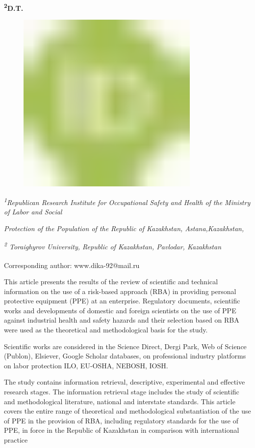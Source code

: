 {\bfseries \textsuperscript{2}D.T.
\begin{figure}[H]
	\centering
	\includegraphics[width=0.8\textwidth]{media/chem2/image1}
	\caption*{}
\end{figure}


\emph{\textsuperscript{1}Republican Research Institute for Occupational
Safety and Health of the Ministry of Labor and Social}

\emph{Protection of the Population of the Republic of Kazakhstan,
Astana,Kazakhstan,}

\emph{\textsuperscript{2} Toraighyrov University, Republic of
Kazakhstan, Pavlodar, Kazakhstan}

{\bfseries \textsuperscript{\envelope }}Corresponding author: www.dika-92@mail.ru

This article presents the results of the review of scientific and
technical information on the use of a risk-based approach (RBA) in
providing personal protective equipment (PPE) at an enterprise.
Regulatory documents, scientific works and developments of domestic and
foreign scientists on the use of PPE against industrial health and
safety hazards and their selection based on RBA were used as the
theoretical and methodological basis for the study.

Scientific works are considered in the Science Direct, Dergi Park, Web
of Science (Publon), Elsiever, Google Scholar databases, on professional
industry platforms on labor protection ILO, EU-OSHA, NEBOSH, IOSH.

The study contains information retrieval, descriptive, experimental and
effective research stages. The information retrieval stage includes the
study of scientific and methodological literature, national and
interstate standards. This article covers the entire range of
theoretical and methodological substantiation of the use of PPE in the
provision of RBA, including regulatory standards for the use of PPE, in
force in the Republic of Kazakhstan in comparison with international
practice

}
